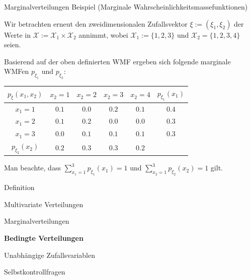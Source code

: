\documentclass[
  8pt,
  ignorenonframetext,
]{beamer}
\begin{document}
\begin{frame}{Marginalverteilungen}
\protect\hypertarget{marginalverteilungen-2}{}
Beispiel (Marginale Wahrscheinlichkeitsmassefunktionen)

\vspace{2mm}

\small
\justifying

Wir betrachten erneut den zweidimensionalen Zufallsvektor
\(\xi:= (\xi_1,\xi_2)\) der Werte in
\(\mathcal{X} := \mathcal{X}_1 \times \mathcal{X}_2\) annimmt, wobei
\(\mathcal{X}_1 := \{1,2,3\}\) und \(\mathcal{X}_2 = \{1,2,3,4\}\)
seien. \vspace{1mm}

Basierend auf der oben definierten WMF ergeben sich folgende marginale
WMFen \(p_{\xi_1}\) und \(p_{\xi_2}\): \vspace{2mm}

\begin{table}\label{tab:wmf_marginal}
\begin{center}
\begin{tabular}{|c|cccc|c|}
\hline
$p_\xi(x_1,x_2)$    &   $x_2 = 1$   &   $x_2 = 2$   &   $x_2 = 3$   &   $x_2 = 4$   & $p_{\xi_1}(x_1)$  \\\hline
$x_1 = 1$           &   $0.1$       &   $0.0$       &   $0.2$       &   $0.1$       & $0.4$             \\
$x_1 = 2$           &   $0.1$       &   $0.2$       &   $0.0$       &   $0.0$       & $0.3$             \\
$x_1 = 3$           &   $0.0$       &   $0.1$       &   $0.1$       &   $0.1$       & $0.3$             \\\hline
$p_{\xi_2}(x_2)$    &   $0.2$       &   $0.3$       &   $0.3$       &   $0.2$       &                   \\\hline
\end{tabular}
\end{center}
\end{table}
\vspace{2mm}

Man beachte, dass \(\sum_{x_1 = 1}^3 p_{\xi_1}(x_1) = 1\) und
\(\sum_{x_2 = 1}^3 p_{\xi_2}(x_2) = 1\) gilt.
\end{frame}

\begin{frame}{}
\protect\hypertarget{section-8}{}
\large
{}
\vfill

Definition

Multivariate Verteilungen

Marginalverteilungen

\textbf{Bedingte Verteilungen}

Unabhängige Zufallsvariablen

Selbstkontrollfragen

\vfill
\end{frame}
\end{document}
